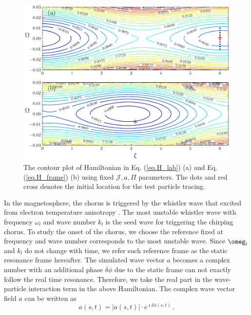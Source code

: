 \begin{figure}
    \centering
    \includegraphics[scale=0.5]{img/Hamcontour.pdf}
    \caption{The contour plot of Hamiltonian in Eq. (\ref{eq.H_lab}) (a) and  Eq. (\ref{eq.H_frame}) (b) using fixed $\mathcal{J}, a, \Pi$ parameters. The dots and red cross denotes the initial location for the test particle tracing.
    \label{fig.Hamcontour}
    }
\end{figure}

In the magnetosphere, the chorus is triggered by the whistler wave \cite{omura_theory_2008,tao_theoretical_2020} that excited from electron temperature anisotropy \cite{gary_1993}. 
The most unstable whistler wave with frequency $\omega_l$ and wave number $k_l$ is the seed wave for triggering the chirping chorus.
To study the onset of the chorus, we choose the reference fixed at frequency and wave number corresponds to the most unstable wave. 
Since $\omeg_l$ and $k_l$ do not change with time, we refer such reference frame as the static resonance frame hereafter. 
The simulated wave vector $a$ becomes a complex number with an additional phase $\delta \phi$ due to the static frame can not exactly follow the real time resonance. Therefore, we take the real part in the wave-particle interaction term in the above Hamiltonian.
The complex wave vector field $a$ can be written as 
\begin{equation}
    a(s,t) = |a(s,t)| \cdot e^{\imath \delta \phi(s,t)}~.
\end{equation}

